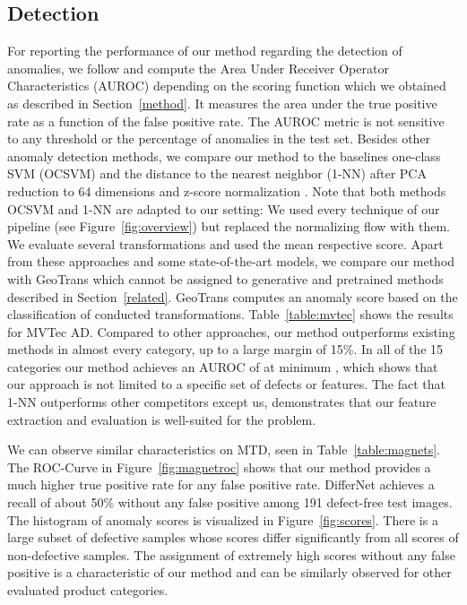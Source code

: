 \documentclass[10pt,twocolumn,letterpaper]{article}
\begin{document}
\subsection{Detection}
For reporting the performance of our method regarding the detection of anomalies, we follow \cite{ganomaly} and compute the Area Under Receiver Operator Characteristics (AUROC) depending on the scoring function which we obtained as described in Section~\ref{method}.
It measures the area under the true positive rate as a function of the false positive rate.
The AUROC metric is not sensitive to any threshold or the percentage of anomalies in the test set.
Besides other anomaly detection methods, we compare our method to the baselines one-class SVM (OCSVM) \cite{andrews} and the distance to the nearest neighbor (1-NN) after PCA reduction to 64 dimensions and z-score normalization \cite{nazare}.
Note that both methods OCSVM and 1-NN are adapted to our setting:
We used every technique of our pipeline (see Figure~\ref{fig:overview}) but replaced the normalizing flow with them.
We evaluate several transformations and used the mean respective score. 
Apart from these approaches and some state-of-the-art models, we compare our method with GeoTrans \cite{geotrans} which cannot be assigned to generative and pretrained methods described in Section~\ref{related}. 
GeoTrans computes an anomaly score based on the classification of conducted transformations.
Table~\ref{table:mvtec} shows the results for MVTec AD.
Compared to other approaches, our method outperforms existing methods in almost every category, up to a large margin of 15\%.
In all of the 15 categories our method achieves an AUROC of at minimum , which shows that our approach is not limited to a specific set of defects or features.
The fact that 1-NN outperforms other competitors except us, demonstrates that our feature extraction and evaluation is well-suited for the problem.

We can observe similar characteristics on MTD, seen in Table~\ref{table:magnets}.
The ROC-Curve in Figure~\ref{fig:magnetroc} shows that our method provides a much higher true positive rate for any false positive rate. DifferNet achieves a recall of about 50\% without any false positive among 191 defect-free test images.
The histogram of anomaly scores is visualized in Figure~\ref{fig:scores}.
There is a large subset of defective samples whose scores differ significantly from all scores of non-defective samples.
The assignment of extremely high scores without any false positive is a characteristic of our method and can be similarly observed for other evaluated product categories.
\end{document}
